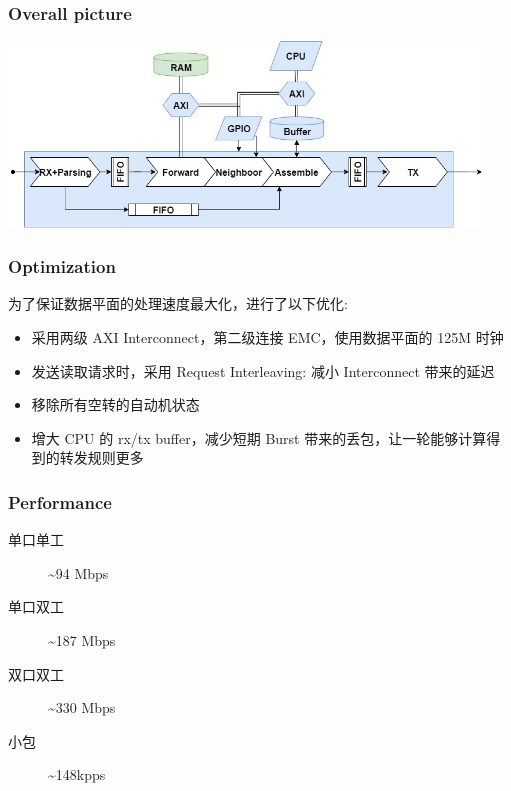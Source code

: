 \documentclass[UTF-8]{ctexbeamer}
\begin{document}
\begin{frame}
  \frametitle{Overall picture}

  \begin{center}
    \includegraphics[width=0.95\textwidth]{assets/overall-pic.jpg}
  \end{center}
\end{frame}

\begin{frame}
  \frametitle{Optimization}

  为了保证数据平面的处理速度最大化，进行了以下优化:
  \begin{itemize}
    \item 采用两级 AXI Interconnect，第二级连接 EMC，使用数据平面的 125M 时钟
    \item 发送读取请求时，采用 Request Interleaving: 减小 Interconnect 带来的延迟
    \item 移除所有空转的自动机状态
    \item 增大 CPU 的 rx/tx buffer，减少短期 Burst 带来的丢包，让一轮能够计算得到的转发规则更多
  \end{itemize}
\end{frame}

\begin{frame}
  \frametitle{Performance}
  \begin{description}
    \item[单口单工] \textasciitilde 94 Mbps
    \item[单口双工] \textasciitilde 187 Mbps
    \item[双口双工] \textasciitilde 330 Mbps
    \item[小包] \textasciitilde 148kpps
  \end{description}
\end{frame}
\end{document}
